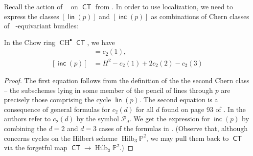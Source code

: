\documentclass{article}
\renewcommand{\P}{\mathbb{P}}
\DeclareMathOperator{\Hilb}{Hilb}
\DeclareMathOperator{\CT}{\mathsf{CT}}
\DeclareMathOperator{\Gm}{\mathbb{G}_{m}}
\DeclareMathOperator{\SQP}{\mathsf{SQP}}
\DeclareMathOperator{\CH}{CH}
\DeclareMathOperator{\BP}{\mathsf{Bpt}}
\DeclareMathOperator{\Lin}{\mathsf{Lin}}
\DeclareMathOperator{\Inc}{\mathsf{Inc}}
\DeclareMathOperator{\lin}{\mathsf{lin}}
\DeclareMathOperator{\inc}{\mathsf{inc}}
\begin{document}
Recall the action of $\Gm$ on $\CT$ from . In order to use localization, we need to express the classes $[\lin(p)]$ and $[\inc(p)]$ as combinations of Chern classes of $\Gm$-equivariant bundles:

\begin{lemma}
    \label{lemma:IncLinclasses} In the Chow ring $\CH^{\bullet}\CT$, we have \begin{align}
        [\lin(p)] &= c_{2}(1),\\
        [\inc(p)] &= H^{2} - c_{2}(1) + 2c_{2}(2)-c_{2}(3)
        \end{align}
    \end{lemma}

\begin{proof}
    The first equation follows from the definition of the the second Chern class -- the subschemes lying in some member of the pencil of lines through $p$ are precisely those comprising the cycle $\lin(p)$.  The second equation is a consequence of general formulas for $c_{2}(d)$ for all $d$ found on page 93 of \cite{elencwajg2006explicit}.  In  the authors refer to $c_{2}(d)$ by the symbol $\mathcal{P}_{d}$.  We get the expression for $\inc(p)$ by combining the $d=2$ and $d=3$ cases of the formulas in \cite{elencwajg2006explicit}. (Observe that, although \cite{elencwajg2006explicit} concerns cycles on the Hilbert scheme $\Hilb_{3}\P^{2}$, we may pull them back to $\CT$ via the forgetful map $\CT \to \Hilb_{3}\P^{2}$.)
\end{proof} 


\end{document}
